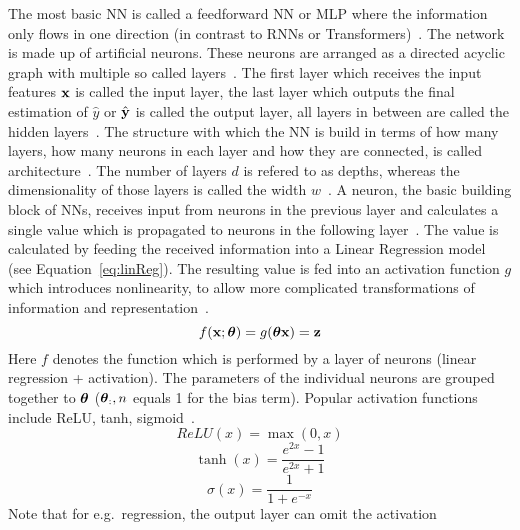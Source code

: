 The most basic \ac{NN} is called a feedforward \ac{NN} or \ac{MLP} where the information only
flows in one direction (in contrast to \acp{RNN} or Transformers)~\citep{goodfellow_deep_2016}.
The network is made up of artificial neurons.
These neurons are arranged as a directed acyclic graph with multiple so
called layers~\citep{goodfellow_deep_2016}.
The first layer which receives the input features $\textbf{x}$ is called the input layer, the last layer
which outputs the final estimation of $\hat{y}$ or $\hat{\textbf{y}}$ is called the output layer, all layers in between
are called the hidden layers~\citep{shrestha_review_2019}.
The structure with which the \ac{NN} is build in terms of how many layers, how many neurons in each
layer and how they are connected, is called architecture~\citep{goodfellow_deep_2016}.
The number of layers $d$ is refered to as depths, whereas the dimensionality of those layers is
called the width $w$~\citep{goodfellow_deep_2016}.
A neuron, the basic building block of \acp{NN}, receives input from neurons in the previous layer
and calculates a single value which is propagated to neurons in the following
layer~\citep{shrestha_review_2019}.
The value is calculated by feeding the received information into a Linear Regression model (see
Equation~\ref{eq:linReg}).
The resulting value is fed into an activation function $g$ which introduces nonlinearity, to allow
more complicated transformations of information and representation~\citep{goodfellow_deep_2016}.
\begin{equation}\label{eq:neuron}
    f(\textbf{x};\boldsymbol{\theta}) = g(\boldsymbol{\theta}\textbf{x})=\textbf{z}
\end{equation}
Here $f$ denotes the function which is performed by a layer of neurons (linear regression + activation).
The parameters of the individual neurons are grouped together to $\boldsymbol{\theta}$ ($\boldsymbol{\theta}_:,n$ equals 1 for the
bias term).
Popular activation functions include ReLU, tanh, sigmoid~\citep{shrestha_review_2019}.
\begin{equation}\label{eq:relu}
    ReLU(x)=\max(0,x)
\end{equation}
\begin{equation}\label{eq:tanh}
    \tanh(x)=\frac{e^{2x}-1}{e^{2x}+1}
\end{equation}
\begin{equation}\label{eq:sigmoid}
    \sigma(x)=\frac{1}{1+e^{-x}}
\end{equation}
Note that for e.g.\ regression, the output layer can omit the activation
